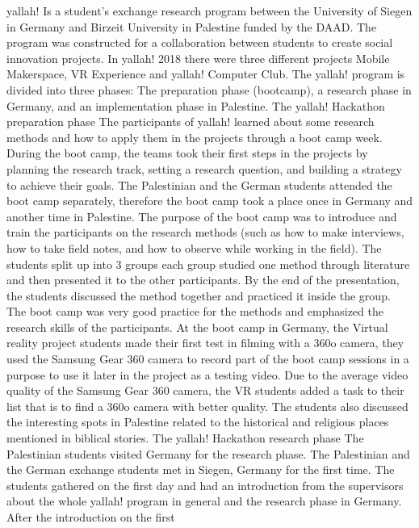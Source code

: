 \acrshort{yallah!} Is a student’s exchange research program between the University of Siegen in
Germany and Birzeit University in Palestine funded by the DAAD. The program was
constructed for a collaboration between students to create social innovation projects.
In \acrshort{yallah!} 2018 there were three different projects Mobile Makerspace, VR Experience and
\acrshort{yallah!} Computer Club. The \acrshort{yallah!} program is divided into three phases: The preparation
phase (bootcamp), a research phase in Germany, and an implementation phase in Palestine.
The \acrshort{yallah!} Hackathon preparation phase
The participants of \acrshort{yallah!} learned about some research methods and how to apply them in
the projects through a boot camp week. During the boot camp, the teams took their first
steps in the projects by planning the research track, setting a research question, and building
a strategy to achieve their goals.
The Palestinian and the German students attended the boot camp separately, therefore the
boot camp took a place once in Germany and another time in Palestine. The purpose of the
boot camp was to introduce and train the participants on the research methods (such as how
to make interviews, how to take field notes, and how to observe while working in the field).
The students split up into 3 groups each group studied one method through literature and
then presented it to the other participants. By the end of the presentation, the students
discussed the method together and practiced it inside the group. The boot camp was very
good practice for the methods and emphasized the research skills of the participants. At the
boot camp in Germany, the Virtual reality project students made their first test in filming with
a 360o camera, they used the Samsung Gear 360 camera to record part of the boot camp
sessions in a purpose to use it later in the project as a testing video. Due to the average video
quality of the Samsung Gear 360 camera, the VR students added a task to their list that is to
find a 360o camera with better quality. The students also discussed the interesting spots in
Palestine related to the historical and religious places mentioned in biblical stories.
The \acrshort{yallah!} Hackathon research phase
The Palestinian students visited Germany for the research phase. The Palestinian and the
German exchange students met in Siegen, Germany for the first time. The students gathered
on the first day and had an introduction from the supervisors about the whole \acrshort{yallah!}
program in general and the research phase in Germany. After the introduction on the first
